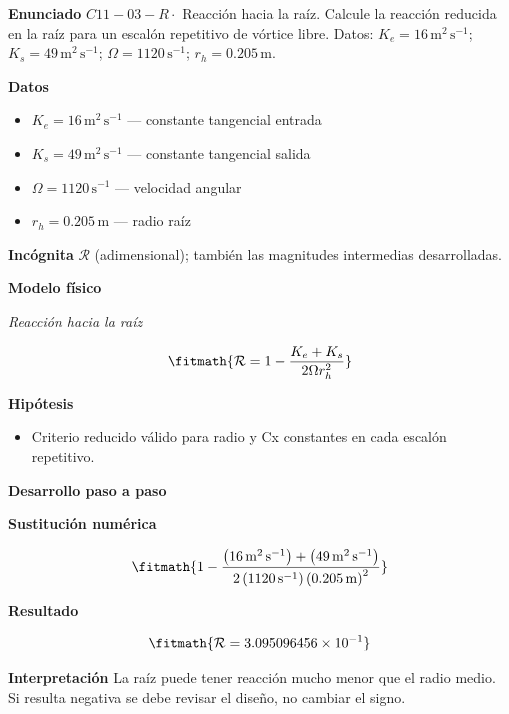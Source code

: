 \documentclass[10pt,openany]{book}
\begin{document}
\begin{tcolorbox}[title={Problema resuelto 3}, studiumworked, breakable]

\noindent\textbf{Enunciado}
\(C11-03-R \cdot\) Reacción hacia la raíz. Calcule la reacción reducida en la raíz para un escalón repetitivo de vórtice libre. Datos: \(K_e=16\, \mathrm{m}^{2}\,\mathrm{s}^{-1}\); \(K_s=49\, \mathrm{m}^{2}\,\mathrm{s}^{-1}\); \(\Omega=1120\, \mathrm{s}^{-1}\); \(r_h=0.205\, \mathrm{m}\).

\noindent\textbf{Datos}
\begin{itemize}
\item $K_e = 16\,\mathrm{m}^{2}\,\mathrm{s}^{-1}$ — constante tangencial entrada
\item $K_s = 49\,\mathrm{m}^{2}\,\mathrm{s}^{-1}$ — constante tangencial salida
\item $\Omega = 1120\,\mathrm{s}^{-1}$ — velocidad angular
\item $r_h = 0.205\,\mathrm{m}$ — radio raíz
\end{itemize}

\noindent\textbf{Incógnita}
$\mathcal{R}$ (adimensional); también las magnitudes intermedias desarrolladas.

\noindent\textbf{Modelo físico}

\noindent\textit{Reacción hacia la raíz}

\[
\fitmath{\mathcal R=1 - \frac{K_e + K_s}{2 \Omega r_h^{2}}}
\]

\noindent\textbf{Hipótesis}
\begin{itemize}
\item Criterio reducido válido para radio y Cx constantes en cada escalón repetitivo.
\end{itemize}

\noindent\textbf{Desarrollo paso a paso}



\noindent\textbf{Sustitución numérica}

\[
\fitmath{1 - \frac{\left(16\,\mathrm{m}^{2}\,\mathrm{s}^{-1}\right) + \left(49\,\mathrm{m}^{2}\,\mathrm{s}^{-1}\right)}{2 \left(1120\,\mathrm{s}^{-1}\right) \left(0.205\,\mathrm{m}\right)^{2}}}
\]

\noindent\textbf{Resultado}

\[
\fitmath{\mathcal R=3.095096456\times10^{-1}}
\]

\noindent\textbf{Interpretación}
La raíz puede tener reacción mucho menor que el radio medio. Si resulta negativa se debe revisar el diseño, no cambiar el signo.


\end{tcolorbox}
\end{document}
